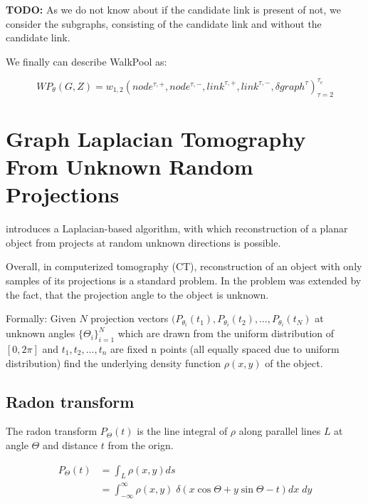 \textbf{TODO:}
As we do not know about if the candidate link is present of not, we consider the subgraphs,
consisting of the candidate link and without the candidate link.


We finally can describe WalkPool as:

\begin{equation}
    WP_{\theta}(G, Z) =w_{1,2}(node^{\tau, +}, node^{\tau, -}, link^{\tau, +}, link^{\tau, -}, \delta graph^{\tau})^{\tau_c}_{\tau = 2}
\end{equation}


\section{Graph Laplacian Tomography From Unknown Random Projections}

\citet{LaplaceRandomProjections} introduces a Laplacian-based algorithm, with which 
reconstruction of a planar object from projects at random unknown directions is possible.

Overall, in computerized tomography (CT), reconstruction of an object with only samples of its projections
is a standard problem. In \citet{LaplaceRandomProjections} the problem was extended by the fact,
that the projection angle to the object is unknown.

Formally:
Given $N$ projection vectors $( P_{\theta_i}(t_1), P_{\theta_i}(t_2), \dots, P_{\theta_i}(t_N)$ 
at unknown angles $\{\Theta_i\}^N_{i=1}$ which are drawn from the uniform distribution of $[0, 2\pi]$
and $t_1, t_2, \dots, t_n$ are fixed n points (all equally spaced due to uniform distribution) 
find the underlying density function $\rho (x,y)$ of the object.

\subsection{Radon transform}

The radon transform $P_{\Theta}(t)$ is the line integral of $\rho$
along parallel lines $L$ at angle $\Theta$ and distance $t$ from the orign.

\begin{equation}
    \begin{aligned}
        P_{\Theta}(t) &= \int_L \rho (x,y) ds \\
                      &=  \int_{-\infty}^{\infty} \rho (x,y) \; \delta(x \cos \Theta + y \sin \Theta - t) dx \; dy
    \end{aligned}
\end{equation}


